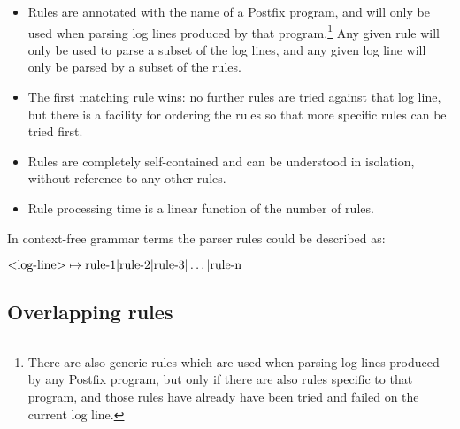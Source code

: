 \documentclass[a4paper,12pt,draft]{article}
\begin{document}
\begin{itemize}

    \item Rules are annotated with the name of a Postfix program, and will
        only be used when parsing log lines produced by that
        program.\footnote{There are also generic rules which are used when
        parsing log lines produced by any Postfix program, but only if
        there are also rules specific to that program, and those rules have
        already have been tried and failed on the current log line.}  Any
        given rule will only be used to parse a subset of the log lines,
        and any given log line will only be parsed by a subset of the
        rules.

    \item The first matching rule wins: no further rules are tried against
        that log line, but there is a facility for ordering the rules so
        that more specific rules can be tried first.

    \item Rules are completely self-contained and can be understood in
        isolation, without reference to any other rules.

    \item Rule processing time is a linear function of the number of rules.

\end{itemize}

\label{comparison against context-free grammars}

In context-free grammar terms the parser rules could be described as:

$\text{\textless{}log-line\textgreater{}} \mapsto \text{rule-1} |
\text{rule-2} | \text{rule-3} | \dots | \text{rule-n}$


\subsection{Overlapping rules}

\label{overlapping rules}
\end{document}
